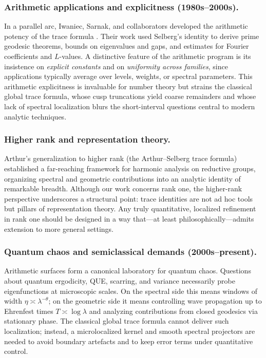 \subsubsection*{Arithmetic applications and explicitness (1980s–2000s).}
In a parallel arc, Iwaniec, Sarnak, and collaborators developed the arithmetic potency
of the trace formula \cite{Iwaniec2002,LuoSarnak1995}. Their work used Selberg’s
identity to derive prime geodesic theorems, bounds on eigenvalues and gaps, and
estimates for Fourier coefficients and $L$-values. A distinctive feature of the
arithmetic program is its insistence on \emph{explicit constants} and on
\emph{uniformity across families}, since applications typically average over levels,
weights, or spectral parameters. This arithmetic explicitness is invaluable for number
theory but strains the classical global trace formula, whose cusp truncations yield
coarse remainders and whose lack of spectral localization blurs the short-interval
questions central to modern analytic techniques.

\subsubsection*{Higher rank and representation theory.}
Arthur’s generalization to higher rank (the Arthur–Selberg trace formula)
\cite{ArthurBook} established a far-reaching framework for harmonic analysis on
reductive groups, organizing spectral and geometric contributions into an analytic
identity of remarkable breadth. Although our work concerns rank one, the higher-rank
perspective underscores a structural point: trace identities are not ad hoc tools but
pillars of representation theory. Any truly quantitative, localized refinement in rank
one should be designed in a way that—at least philosophically—admits extension to more
general settings.

\subsubsection*{Quantum chaos and semiclassical demands (2000s–present).}
Arithmetic surfaces form a canonical laboratory for quantum chaos. Questions about
quantum ergodicity, QUE, scarring, and variance necessarily probe eigenfunctions at
microscopic scales. On the spectral side this means windows of width
$\eta\asymp\lambda^{-\theta}$; on the geometric side it means controlling wave
propagation up to Ehrenfest times $T\asymp\log\lambda$ and analyzing contributions
from closed geodesics via stationary phase. The classical global trace formula cannot
deliver such localization; instead, a microlocalized kernel and smooth spectral
projectors are needed to avoid boundary artefacts and to keep error terms under
quantitative control.

